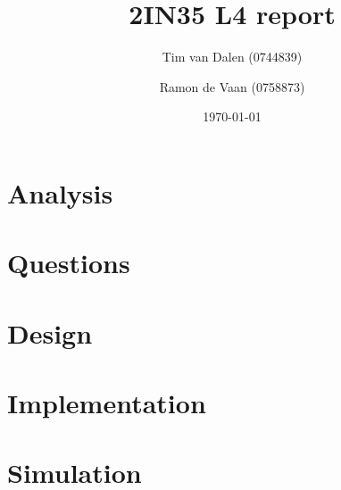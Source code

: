 \documentclass[a4paper,11pt]{article}
\title{
	2IN35 L4 report
}
\author{
	Tim van Dalen (0744839)
	\and
	Ramon de Vaan (0758873)
}
\date{\today}
\begin{document}
	\maketitle

	\section{Analysis}
	

	\section{Questions}
	

	\section{Design}
	

	\section{Implementation}
	

	\section{Simulation}
	

	\appendix
	
\end{document}
